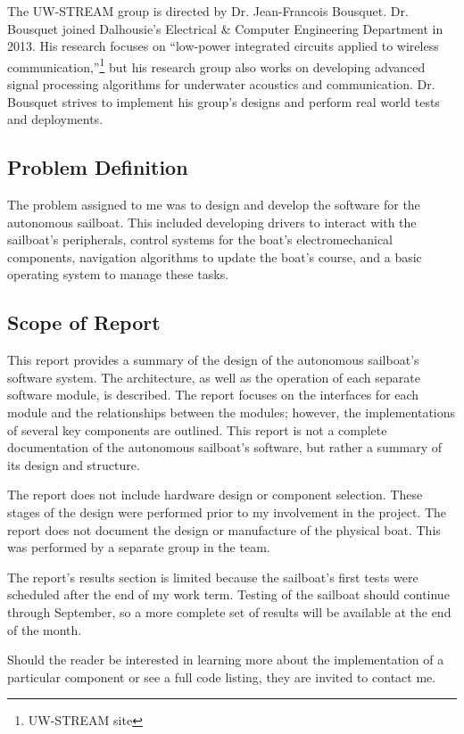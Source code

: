 \documentclass[12pt]{article}
\begin{document}
The UW-STREAM group is directed by Dr. Jean-Francois Bousquet. Dr. Bousquet joined Dalhousie's Electrical \& Computer Engineering Department in 2013. His research focuses on ``low-power integrated circuits applied to wireless communication,''\footnote{UW-STREAM site} but his research group also works on developing advanced signal processing algorithms for underwater acoustics and communication. Dr. Bousquet strives to implement his group's designs and perform real world tests and deployments.

\subsection{Problem Definition}
The problem assigned to me was to design and develop the software for the autonomous sailboat. This included developing drivers to interact with the sailboat's peripherals, control systems for the boat's electromechanical components, navigation algorithms to update the boat's course, and a basic operating system to manage these tasks.

\subsection{Scope of Report}
This report provides a summary of the design of the autonomous sailboat's software system. The architecture, as well as the operation of each separate software module, is described. The report focuses on the interfaces for each module and the relationships between the modules; however, the implementations of several key components are outlined. This report is not a complete documentation of the autonomous sailboat's software, but rather a summary of its design and structure.

The report does not include hardware design or component selection. These stages of the design were performed prior to my involvement in the project. The report does not document the design or manufacture of the physical boat. This was performed by a separate group in the team. 

The report's results section is limited because the sailboat's first tests were scheduled after the end of my work term. Testing of the sailboat should continue through September, so a more complete set of results will be available at the end of the month.

Should the reader be interested in learning more about the implementation of a particular component or see a full code listing, they are invited to contact me.
\end{document}
